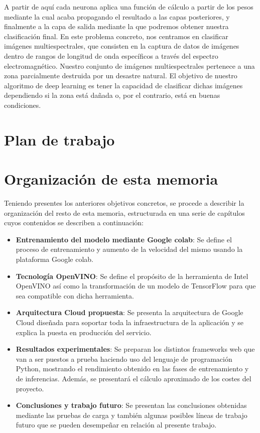 A partir de aquí cada neurona aplica una función de cálculo a partir de los pesos mediante la cual acaba propagando el resultado a las capas posteriores, y
finalmente a la capa de salida mediante la que podremos obtener nuestra clasificación final.
En este problema concreto, nos centramos en clasificar imágenes multiespectrales,
que consisten en la captura de datos de imágenes dentro de rangos de longitud de onda específicos a través del espectro electromagnético.
Nuestro conjunto de imágenes multiespectrales pertenece a una zona parcialmente destruida por un desastre natural.
El objetivo de nuestro algoritmo de deep learning es tener la capacidad de clasificar dichas imágenes dependiendo si la zona está dañada o,
por el contrario, está en buenas condiciones.

\section{Plan de trabajo}

\section{Organización de esta memoria}\label{sec:organización-de-esta-memoria}

Teniendo presentes los anteriores objetivos concretos, se procede a describir la organización del resto de esta memoria, estructurada en una serie de capítulos cuyos contenidos se
describen a continuación:

\begin{itemize}
    \item \textbf{Entrenamiento del modelo mediante Google colab}: Se define el proceso de entrenamiento y aumento de la velocidad del mismo usando la plataforma Google colab.
    \item \textbf{Tecnología OpenVINO}: Se define el propósito de la herramienta de Intel OpenVINO así como la transformación de un modelo de TensorFlow para que sea compatible con dicha herramienta.
    \item \textbf{Arquitectura Cloud propuesta}: Se presenta la arquitectura de Google Cloud diseñada para soportar toda la infraestructura de la aplicación y se explica la puesta en producción del servicio.
    \item \textbf{Resultados experimentales}: Se preparan los distintos frameworks web que van a ser puestos a prueba haciendo uso del lenguaje de programación Python, mostrando el rendimiento obtenido en las fases de entrenamiento y de inferencias. Además, se presentará el cálculo aproximado de los costes del proyecto.
    \item \textbf{Conclusiones y trabajo futuro}: Se presentan las conclusiones obtenidas mediante las pruebas de carga y también algunas posibles líneas de trabajo futuro que se pueden desempeñar en relación al presente trabajo.
\end{itemize}